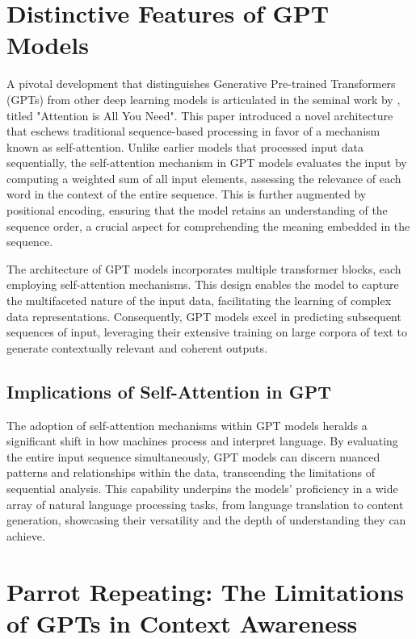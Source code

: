\documentclass{article}
\begin{document}
\section{Distinctive Features of GPT Models}

A pivotal development that distinguishes Generative Pre-trained Transformers (GPTs) from other deep learning models is articulated in the seminal work by \citet{vaswani2017attention}, titled "Attention is All You Need". This paper introduced a novel architecture that eschews traditional sequence-based processing in favor of a mechanism known as self-attention. Unlike earlier models that processed input data sequentially, the self-attention mechanism in GPT models evaluates the input by computing a weighted sum of all input elements, assessing the relevance of each word in the context of the entire sequence. This is further augmented by positional encoding, ensuring that the model retains an understanding of the sequence order, a crucial aspect for comprehending the meaning embedded in the sequence.

The architecture of GPT models incorporates multiple transformer blocks, each employing self-attention mechanisms. This design enables the model to capture the multifaceted nature of the input data, facilitating the learning of complex data representations. Consequently, GPT models excel in predicting subsequent sequences of input, leveraging their extensive training on large corpora of text to generate contextually relevant and coherent outputs.

\subsection{Implications of Self-Attention in GPT}

The adoption of self-attention mechanisms within GPT models heralds a significant shift in how machines process and interpret language. By evaluating the entire input sequence simultaneously, GPT models can discern nuanced patterns and relationships within the data, transcending the limitations of sequential analysis. This capability underpins the models' proficiency in a wide array of natural language processing tasks, from language translation to content generation, showcasing their versatility and the depth of understanding they can achieve.

\section{Parrot Repeating: The Limitations of GPTs in Context Awareness}
\end{document}
